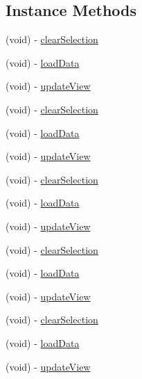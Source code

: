 \subsection*{Instance Methods}
\begin{DoxyCompactItemize}
\item 
(void) -\/ \hyperlink{interfaceFBGraphObjectPickerViewController_aa73bb2a67b80e42227f81f4fba16e7b4}{clear\+Selection}
\item 
(void) -\/ \hyperlink{interfaceFBGraphObjectPickerViewController_ad2679fd3904b7d46c40a9c861cd468dc}{load\+Data}
\item 
(void) -\/ \hyperlink{interfaceFBGraphObjectPickerViewController_a4553f2ebea1891b75c18551c7a9cefc5}{update\+View}
\item 
(void) -\/ \hyperlink{interfaceFBGraphObjectPickerViewController_aa73bb2a67b80e42227f81f4fba16e7b4}{clear\+Selection}
\item 
(void) -\/ \hyperlink{interfaceFBGraphObjectPickerViewController_ad2679fd3904b7d46c40a9c861cd468dc}{load\+Data}
\item 
(void) -\/ \hyperlink{interfaceFBGraphObjectPickerViewController_a4553f2ebea1891b75c18551c7a9cefc5}{update\+View}
\item 
(void) -\/ \hyperlink{interfaceFBGraphObjectPickerViewController_aa73bb2a67b80e42227f81f4fba16e7b4}{clear\+Selection}
\item 
(void) -\/ \hyperlink{interfaceFBGraphObjectPickerViewController_ad2679fd3904b7d46c40a9c861cd468dc}{load\+Data}
\item 
(void) -\/ \hyperlink{interfaceFBGraphObjectPickerViewController_a4553f2ebea1891b75c18551c7a9cefc5}{update\+View}
\item 
(void) -\/ \hyperlink{interfaceFBGraphObjectPickerViewController_aa73bb2a67b80e42227f81f4fba16e7b4}{clear\+Selection}
\item 
(void) -\/ \hyperlink{interfaceFBGraphObjectPickerViewController_ad2679fd3904b7d46c40a9c861cd468dc}{load\+Data}
\item 
(void) -\/ \hyperlink{interfaceFBGraphObjectPickerViewController_a4553f2ebea1891b75c18551c7a9cefc5}{update\+View}
\item 
(void) -\/ \hyperlink{interfaceFBGraphObjectPickerViewController_aa73bb2a67b80e42227f81f4fba16e7b4}{clear\+Selection}
\item 
(void) -\/ \hyperlink{interfaceFBGraphObjectPickerViewController_ad2679fd3904b7d46c40a9c861cd468dc}{load\+Data}
\item 
(void) -\/ \hyperlink{interfaceFBGraphObjectPickerViewController_a4553f2ebea1891b75c18551c7a9cefc5}{update\+View}
\end{DoxyCompactItemize}
